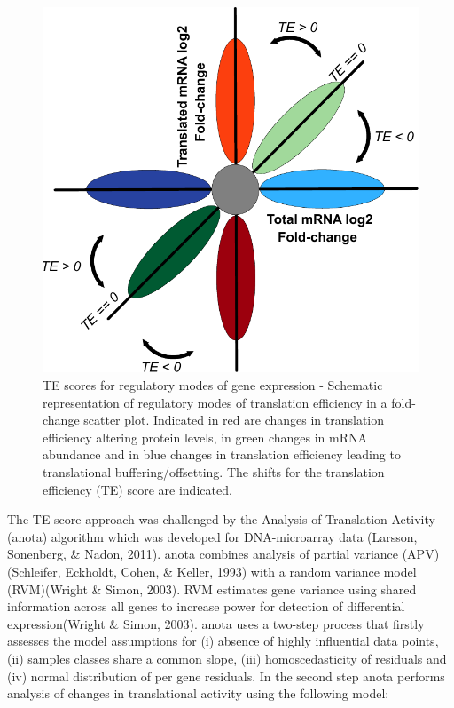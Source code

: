 \documentclass[
  12pt,
  openany]{book}
\begin{document}
\begin{figure}
  \includegraphics{./figures/geneModes_TE.pdf}
  \caption{TE scores for regulatory modes of gene expression -  Schematic representation of regulatory modes of translation efficiency in a fold-change scatter plot. Indicated in red are changes in translation efficiency altering protein levels, in green changes in mRNA abundance and in blue changes in translation efficiency leading to translational buffering/offsetting. The shifts for the translation efficiency (TE) score are indicated. \label{fig:TE}}
\end{figure}

The TE-score approach was challenged by the Analysis of Translation Activity (anota) algorithm which was developed for DNA-microarray data (Larsson, Sonenberg, \& Nadon, 2011). anota combines analysis of partial variance (APV)(Schleifer, Eckholdt, Cohen, \& Keller, 1993) with a random variance model (RVM)(Wright \& Simon, 2003). RVM estimates gene variance using shared information across all genes to increase power for detection of differential expression(Wright \& Simon, 2003). anota uses a two-step process that firstly assesses the model assumptions for (i) absence of highly influential data points, (ii) samples classes share a common slope, (iii) homoscedasticity of residuals and (iv) normal distribution of per gene residuals. In the second step anota performs analysis of changes in translational activity using the following model:
\end{document}
